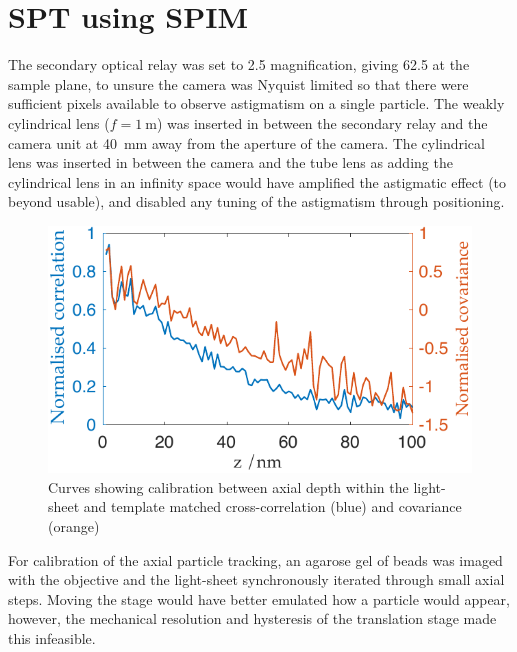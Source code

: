 \section{SPT using SPIM}

The secondary optical relay was set to \SI{2.5}{\times} magnification, giving \SI{62.5}{\times} at the sample plane, to unsure the camera was Nyquist limited so that there were sufficient pixels available to observe astigmatism on a single particle.
The weakly cylindrical lens ($f = \SI{1}{\metre}$) was inserted in between the secondary relay and the camera unit at \SI{40}{\milli\metre} away from the aperture of the camera.
The cylindrical lens was inserted in between the camera and the tube lens as adding the cylindrical lens in an infinity space would have amplified the astigmatic effect (to beyond usable), and disabled any tuning of the astigmatism through positioning.

%

\begin{figure}[h]
  \centering
  \includegraphics{./calibration/Calibration.pdf}
  \caption{Curves showing calibration between axial depth within the light-sheet and template matched cross-correlation (blue) and covariance (orange)}
  \label{fig:SPT_Calibration}
\end{figure}

For calibration of the axial particle tracking, an agarose gel of beads was imaged with the objective and the light-sheet synchronously iterated through small axial steps.
Moving the stage would have better emulated how a particle would appear, however, the mechanical resolution and hysteresis of the translation stage made this infeasible.

